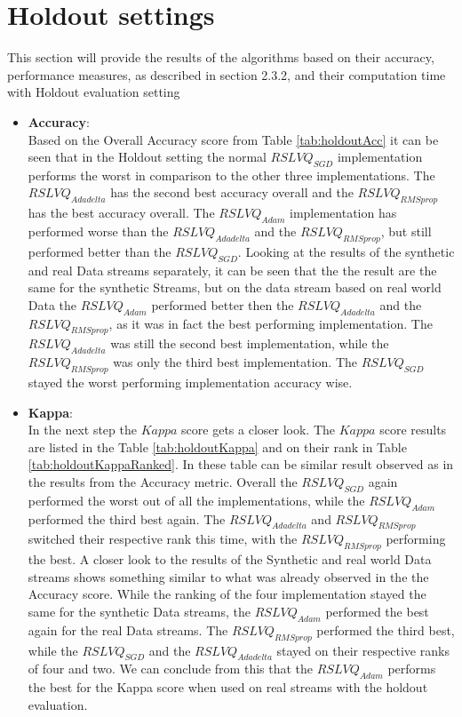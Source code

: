\documentclass[12pt,oneside,a4paper,parskip]{scrbook}
\begin{document}
\section{Holdout settings}
This section will provide the results of the algorithms based on their accuracy, performance measures, as described in section 2.3.2,
and their computation time with Holdout evaluation setting

\begin{itemize}
  \item \textbf{Accuracy}: \\
        Based on the Overall Accuracy score from Table \ref{tab:holdoutAcc} it can be seen that in the Holdout setting the
        normal $RSLVQ_\textit{SGD}$ implementation performs the worst in comparison to the other three implementations.
        The $RSLVQ_\textit{Adadelta}$ has the second best accuracy overall and the $RSLVQ_\textit{RMSprop}$ has the best 
        accuracy overall. The $RSLVQ_\textit{Adam}$ implementation has performed worse than the $RSLVQ_\textit{Adadelta}$
        and the $RSLVQ_\textit{RMSprop}$, but still performed better than the $RSLVQ_\textit{SGD}$.
        Looking at the results of the synthetic and real Data streams separately, it can be seen that the the result are the same
        for the synthetic Streams, but on the data stream based on real world Data the $RSLVQ_\textit{Adam}$ performed better then
        the $RSLVQ_\textit{Adadelta}$ and the $RSLVQ_\textit{RMSprop}$, as it was in fact the best performing implementation.
        The $RSLVQ_\textit{Adadelta}$ was still the second best implementation, while the $RSLVQ_\textit{RMSprop}$ was only the third 
        best implementation. The $RSLVQ_\textit{SGD}$ stayed the worst performing implementation accuracy wise.

  \item \textbf{Kappa}: \\
        In the next step the $Kappa$ score gets a closer look. The $Kappa$ score results are listed in the 
        Table \ref{tab:holdoutKappa} and on their rank in Table \ref{tab:holdoutKappaRanked}.
        In these table can be similar result observed as in the results from the Accuracy metric.
        Overall the $RSLVQ_\textit{SGD}$ again performed the worst out of all the implementations, while the $RSLVQ_\textit{Adam}$
        performed the third best again. The $RSLVQ_\textit{Adadelta}$ and $RSLVQ_\textit{RMSprop}$ switched their respective rank this 
        time, with the $RSLVQ_\textit{RMSprop}$ performing  the best.
        A closer look to the results of the Synthetic and real world Data streams shows something
        similar to what was already observed in the the Accuracy score.
        While the ranking of the four implementation stayed the same for the synthetic Data streams, the $RSLVQ_\textit{Adam}$ performed 
        the best again for the real Data streams. The $RSLVQ_\textit{RMSprop}$ performed the third best, while the $RSLVQ_\textit{SGD}$ and
        the $RSLVQ_\textit{Adadelta}$ stayed on their respective ranks of four and two.
        We can conclude from this that the $RSLVQ_\textit{Adam}$ performs the best for the Kappa score when used on real streams with the holdout
        evaluation.


\end{itemize}
\end{document}

